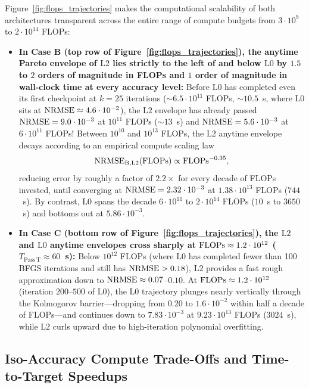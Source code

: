 Figure~\ref{fig:flops_trajectories} makes the computational scalability of both architectures transparent across the entire range of compute budgets from $3\cdot 10^9$ to $2\cdot 10^{14}$ FLOPs:
\begin{itemize}[leftmargin=2em]
  \item \textbf{In Case B (top row of Figure~\ref{fig:flops_trajectories}), the anytime Pareto envelope of $\mathrm{L2}$ lies strictly to the left of and below $\mathrm{L0}$ by $1.5$ to $2$ orders of magnitude in FLOPs and $1$ order of magnitude in wall-clock time at every accuracy level:} Before $\mathrm{L0}$ has completed even its first checkpoint at $k = 25$ iterations ($\sim 6.5\cdot 10^{11}$ FLOPs, $\sim 10.5$~s, where $\mathrm{L0}$ sits at $\mathrm{NRMSE} \approx 4.6\cdot 10^{-2}$), the $\mathrm{L2}$ envelope has already passed $\mathrm{NRMSE} = 9.0\cdot 10^{-3}$ at $10^{11}$ FLOPs ($\sim 13$~s) and $\mathrm{NRMSE} = 5.6\cdot 10^{-3}$ at $6\cdot 10^{11}$ FLOPs! Between $10^{10}$ and $10^{13}$ FLOPs, the $\mathrm{L2}$ anytime envelope decays according to an empirical compute scaling law
  \begin{equation}
    \mathrm{NRMSE}_{\mathrm{B, L2}}(\mathrm{FLOPs}) \propto \mathrm{FLOPs}^{-0.35},
  \end{equation}
  reducing error by roughly a factor of $2.2\times$ for every decade of FLOPs invested, until converging at $\mathrm{NRMSE} = 2.32\cdot 10^{-3}$ at $1.38\cdot 10^{13}$ FLOPs ($744$~s). By contrast, $\mathrm{L0}$ spans the decade $6\cdot 10^{11}$ to $2\cdot 10^{14}$ FLOPs ($10$~s to $3650$~s) and bottoms out at $5.86\cdot 10^{-3}$.
  \item \textbf{In Case C (bottom row of Figure~\ref{fig:flops_trajectories}), the $\mathrm{L2}$ and $\mathrm{L0}$ anytime envelopes cross sharply at $\mathrm{FLOPs} \approx 1.2\cdot 10^{12}$ ($T_{\mathrm{Pass\,T}} \approx 60$~s):} Below $10^{12}$ FLOPs (where $\mathrm{L0}$ has completed fewer than 100 BFGS iterations and still has $\mathrm{NRMSE} > 0.18$), $\mathrm{L2}$ provides a fast rough approximation down to $\mathrm{NRMSE} \approx 0.07$--$0.10$. At $\mathrm{FLOPs} \approx 1.2\cdot 10^{12}$ (iteration $200$--$500$ of $\mathrm{L0}$), the $\mathrm{L0}$ trajectory plunges nearly vertically through the Kolmogorov barrier---dropping from $0.20$ to $1.6\cdot 10^{-2}$ within half a decade of FLOPs---and continues down to $7.83\cdot 10^{-3}$ at $9.23\cdot 10^{13}$ FLOPs ($3024$~s), while $\mathrm{L2}$ curls upward due to high-iteration polynomial overfitting.
\end{itemize}

\subsection{Iso-Accuracy Compute Trade-Offs and Time-to-Target Speedups}


